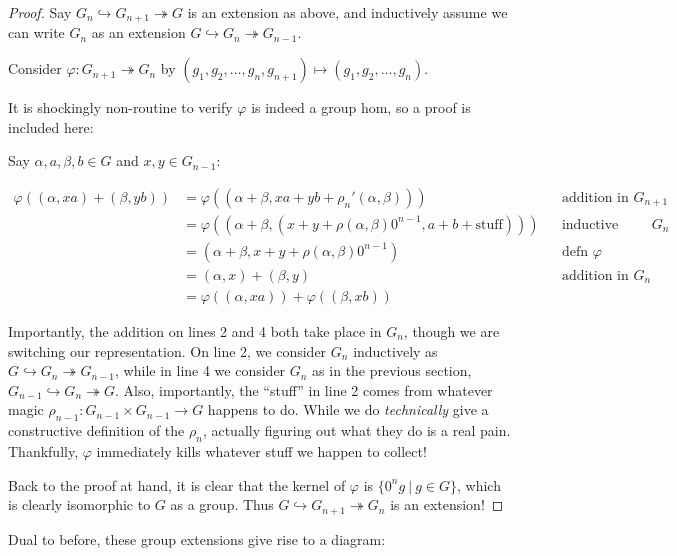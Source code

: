 \documentclass[12pt]{article}
\theoremstyle{definition}
\newcommand{\mono}{\hookrightarrow}
\newcommand{\epi}{\twoheadrightarrow}
\begin{document}
  \begin{proof}
    Say $G_n \mono G_{n+1} \epi G$ is an extension as above, and 
    inductively assume we can write $G_n$ as an extension
    $G \mono G_n \epi G_{n-1}$.

    Consider $\varphi : G_{n+1} \epi G_n$ by 
    $(g_1, g_2, \ldots, g_n, g_{n+1}) \mapsto (g_1, g_2, \ldots, g_n)$.

    It is shockingly non-routine to verify $\varphi$ is indeed a group hom, 
    so a proof is included here:

    Say $\alpha, a, \beta, b \in G$ and $x,y \in G_{n-1}$:

    \begin{align*}
      \varphi((\alpha, xa) + (\beta, yb)) 
      &= \varphi((\alpha + \beta, xa + yb + \rho_n'(\alpha,\beta))) 
        && \text{addition in $G_{n+1}$}\\
      &= \varphi((\alpha + \beta, (x + y + \rho(\alpha,\beta)0^{n-1}, a + b + \text{stuff})))
        && \text{inductive addition in $G_n$}\\
      &= (\alpha + \beta, x+y+\rho(\alpha,\beta)0^{n-1})
        && \text{defn $\varphi$}\\
      &= (\alpha, x) + (\beta, y)
        && \text{addition in $G_n$}\\
      &= \varphi((\alpha,xa)) + \varphi((\beta,xb))
    \end{align*}

    Importantly, the addition on lines 2 and 4 both take place in $G_n$, 
    though we are switching our representation. On line 2, we consider
    $G_n$ inductively as $G \mono G_n \epi G_{n-1}$, while in line 4 we
    consider $G_n$ as in the previous section, $G_{n-1} \mono G_n \epi G$.
    Also, importantly, the ``stuff'' in line 2 comes from whatever
    magic $\rho_{n-1} : G_{n-1} \times G_{n-1} \to G$ happens to do. While
    we do \emph{technically} give a constructive definition of the $\rho_n$,
    actually figuring out what they do is a real pain. Thankfully, $\varphi$
    immediately kills whatever stuff we happen to collect!

    Back to the proof at hand, it is clear that the kernel of $\varphi$ is
    $\{0^ng~|~g \in G \}$, which is clearly isomorphic to $G$ as a group. 
    Thus $G \mono G_{n+1} \epi G_n$ is an extension! 
  \end{proof}

  Dual to before, these group extensions give rise to a diagram:

  \begin{center}
  \end{center}
\end{document}
